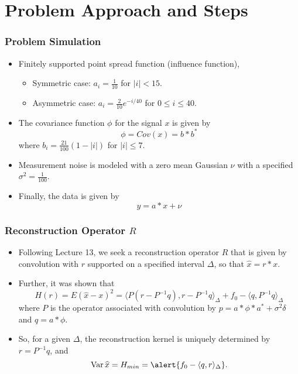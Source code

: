 \documentclass[t]{beamer}
\begin{document}
\section{Problem Approach and Steps} 
\begin{frame}
\frametitle{Problem Simulation}
\begin{itemize}
\item Finitely supported point spread function (influence function), 
  \begin{itemize}
    \item Symmetric case: $a_i = \frac 1{10}$ for $|i| < 15$.  
    \item Asymmetric case: $a_i = \frac 2{10} e^{-i/40}$ for $0\le i\le 40$.
  \end{itemize}
\item The covariance function $\phi$ for the signal $x$ is given by 
$$
\phi = Cov(x) = b*b^{*}
$$
  where $b_i = \frac {21}{100}(1-|i|)$ for $|i| \le 7$. 
\item Measurement noise is modeled with a zero mean Gaussian $\nu$ with a specified $\sigma^2 = \frac 1{100}$.
\item Finally, the data is given by
$$
  y = a * x + \nu
$$
\end{itemize}
\end{frame}

\begin{frame}
  \frametitle{Reconstruction Operator $R$}  
  \begin{itemize}
    \item Following Lecture 13, we seek a reconstruction operator $R$ that is given by convolution with $r$ supported on a specified interval $\Delta$, so that $\widehat x = r*x$.
    \item Further, it was shown that
    $$
      H(r) = E( \widehat x - x )^2 = \langle P (r - P^{-1}q), r- P^{-1}q \rangle_{\Delta} + f_0 - \langle q, P^{-1}q\rangle_{\Delta}
    $$
    where $P$ is the operator associated with convolution by $p = a*\phi*a^* + \sigma^2\delta$ and $q = a*\phi$.
    \item So, for a given $\Delta$, the reconstruction kernel is uniquely determined by \alert{$r = P^{-1}q$}, and 
    $$
      \mathrm{Var}\, \widehat x = H_{min} = \alert{f_0 - \langle q, r\rangle_{\Delta}}.
    $$
  \end{itemize}
\end{frame}
\end{document}
